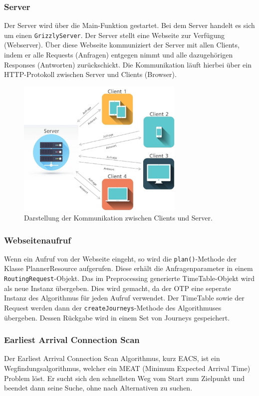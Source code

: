 \subsubsection{Server}
Der Server wird über die Main-Funktion gestartet. Bei dem Server handelt es sich um einen \texttt{GrizzlyServer}. Der Server stellt eine Webseite zur Verfügung (Webserver). Über diese Webseite kommuniziert der Server mit allen Clients, indem er alle Requests (Anfragen) entgegen nimmt und alle dazugehörigen Responses (Antworten) zurückschickt. Die Kommunikation läuft hierbei über ein HTTP-Protokoll zwischen Server und Clients (Browser). 

\begin{figure}[htb]
	\centering
	\includegraphics[width=8cm]{img/serverrequestresponse.jpg}
	\caption{Darstellung der Kommunikation zwischen Clients und Server\cite{server-pic}.}
	\label{fig:serverrequestresponse}
\end{figure}




\subsubsection{Webseitenaufruf}
Wenn ein Aufruf von der Webseite eingeht, so wird die \texttt{plan()}-Methode der Klasse PlannerResource aufgerufen. Diese erhält die Anfragenparameter in einem \texttt{RoutingRequest}-Objekt. Das im Preprocessing generierte TimeTable-Objekt wird als neue Instanz übergeben. Dies wird gemacht, da der OTP eine seperate Instanz des Algorithmus für jeden Aufruf verwendet. Der TimeTable sowie der Request werden dann der \texttt{createJourneys}-Methode des Algorithmuses übergeben. Dessen Rückgabe wird in einem Set von Journeys gespeichert.


\subsubsection{Earliest Arrival Connection Scan}
Der \hypertarget{EAS}{Earliest Arrival Connection Scan Algorithmus}\cite{csa}, kurz EACS, ist ein Wegfindungsalgorithmus, welcher ein \gls{MEAT} (Minimum Expected Arrival Time) Problem löst. Er sucht sich den schnellsten Weg vom Start zum Zielpunkt und beendet dann seine Suche, ohne nach Alternativen zu suchen. \newline

